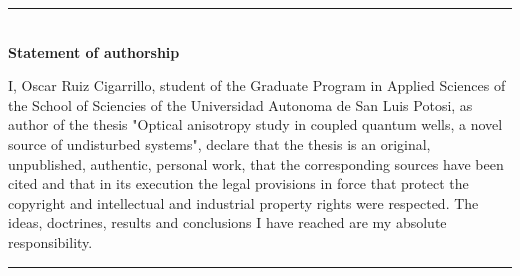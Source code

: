 \cleardoublepage
\begin{vcentrepage}

	\noindent\rule[2pt]{\textwidth}{0.8pt}\\
	{\large\textbf{Statement of authorship }}
	\begin{center}
		\justifying
        I, Oscar Ruiz Cigarrillo, student of the Graduate Program in Applied Sciences of the School of Sciencies of the Universidad Autonoma de San Luis Potosi, as author of the thesis "Optical anisotropy study in coupled quantum wells, a novel source of undisturbed systems", declare that the thesis is an original, unpublished, authentic, personal work, that the corresponding sources have been cited and that in its execution the legal provisions in force that protect the copyright and intellectual and industrial property rights were respected. The ideas, doctrines, results and conclusions I have reached are my absolute responsibility.
	\end{center}
	\noindent\rule[2pt]{\textwidth}{0.8pt}

\end{vcentrepage}

%